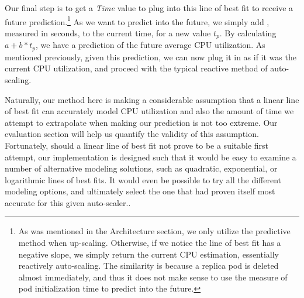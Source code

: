 Our final step is to get a \textit{Time} value to plug into this line of best
fit to receive a future prediction.\footnote{As was mentioned in the
Architecture section, we only utilize the predictive method when up-scaling.
Otherwise, if we notice the line of best fit has a negative slope, we simply
return the current CPU estimation, essentially reactively auto-scaling. The
similarity is because a replica pod is deleted almost immediately, and thus it
does not make sense to use the measure of pod initialization time to predict
into the future.} As we want to predict
 into the future, we simply add
, measured in seconds, to the current time, for a
new value $t_{p}$. By calculating $a + b * t_{p}$, we have a prediction of the
future average CPU utilization. As mentioned previously, given this prediction,
we can now plug it in as if it was the current CPU utilization, and proceed with
the typical reactive method of auto-scaling.

Naturally, our method here is making a considerable assumption that a linear
line of best fit can accurately model CPU utilization and also the amount of
time we attempt to extrapolate when making our prediction is not too extreme.
Our evaluation section will help us quantify the validity of this assumption.
Fortunately, should a linear line of best fit
not prove to be a suitable first attempt, our implementation is designed such
that it would be easy to examine a number of alternative modeling solutions,
such as quadratic, exponential, or logarithmic lines of best fits. It would even
be possible to try all the different modeling options, and ultimately select
the one that had proven itself most accurate for this given auto-scaler..
